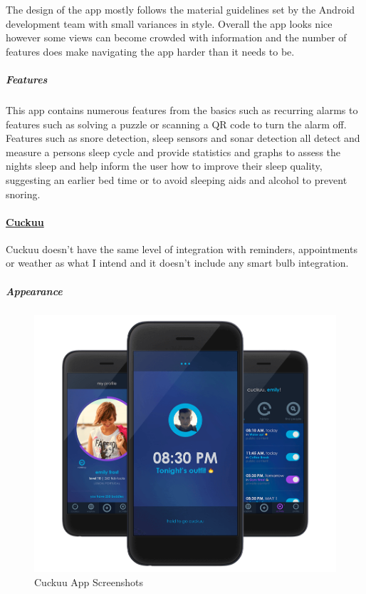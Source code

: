 The design of the app mostly follows the material guidelines set by the
Android development team with small variances in style. Overall the app
looks nice however some views can become crowded with information and
the number of features does make navigating the app harder than it needs
to be.

\subparagraph{Features}\label{features}

This app contains numerous features from the basics such as recurring
alarms to features such as solving a puzzle or scanning a QR code to
turn the alarm off. Features such as snore detection, sleep sensors and
sonar detection all detect and measure a persons sleep cycle and provide
statistics and graphs to assess the nights sleep and help inform the
user how to improve their sleep quality, suggesting an earlier bed time
or to avoid sleeping aids and alcohol to prevent snoring.

\paragraph{\texorpdfstring{\href{https://cuckuu.com/}{Cuckuu}}{Cuckuu}}\label{cuckuu}

Cuckuu doesn't have the same level of integration with reminders,
appointments or weather as what I intend and it doesn't include any
smart bulb integration.

\subparagraph{Appearance}\label{appearance-1}

\begin{figure}
  \begin{center}
    \includegraphics[scale=0.25,keepaspectratio]{Images/cuckuu.png}
    \caption{Cuckuu App Screenshots}
  \end{center}
\end{figure}

